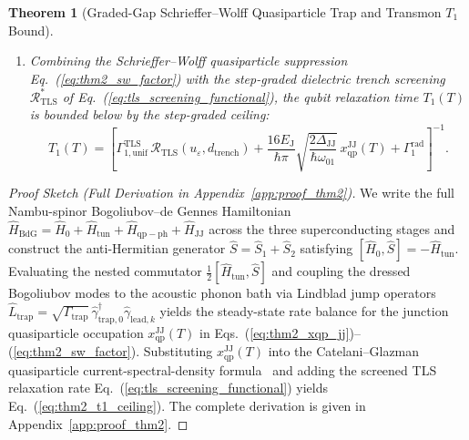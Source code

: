 \documentclass[11pt,letterpaper]{article}
\newtheorem{theorem}{Theorem}
\theoremstyle{definition}
\begin{document}
\begin{theorem}[Graded-Gap Schrieffer--Wolff Quasiparticle Trap and Transmon $T_1$ Bound]
\begin{enumerate}
  \item[(ii)] Combining the Schrieffer--Wolff quasiparticle suppression Eq.~(\ref{eq:thm2_sw_factor}) with the step-graded dielectric trench screening $\mathcal{R}_{\mathrm{TLS}}^*$ of Eq.~(\ref{eq:tls_screening_functional}), the qubit relaxation time $T_1(T)$ is bounded below by the step-graded ceiling:
  \begin{equation}
    T_1(T) = \left[ \Gamma_{1,\mathrm{unif}}^{\mathrm{TLS}} \, \mathcal{R}_{\mathrm{TLS}}(u_\varepsilon, d_{\mathrm{trench}}) + \frac{16 E_{\mathrm{J}}}{\hbar \pi} \sqrt{\frac{2\Delta_{\mathrm{JJ}}}{\hbar\omega_{01}}} \, x_{\mathrm{qp}}^{\mathrm{JJ}}(T) + \Gamma_1^{\mathrm{rad}} \right]^{-1}.
    \label{eq:thm2_t1_ceiling}
  \end{equation}
\end{enumerate}
\end{theorem}

\begin{proof}[Proof Sketch (Full Derivation in Appendix~\ref{app:proof_thm2})]
We write the full Nambu-spinor Bogoliubov--de Gennes Hamiltonian $\hat{H}_{\mathrm{BdG}} = \hat{H}_0 + \hat{H}_{\mathrm{tun}} + \hat{H}_{\mathrm{qp-ph}} + \hat{H}_{\mathrm{JJ}}$ across the three superconducting stages and construct the anti-Hermitian generator $\hat{S} = \hat{S}_1 + \hat{S}_2$ satisfying $[\hat{H}_0, \hat{S}] = -\hat{H}_{\mathrm{tun}}$. Evaluating the nested commutator $\frac{1}{2}[\hat{H}_{\mathrm{tun}}, \hat{S}]$ and coupling the dressed Bogoliubov modes to the acoustic phonon bath via Lindblad jump operators $\hat{L}_{\mathrm{trap}} = \sqrt{\Gamma_{\mathrm{trap}}}\,\hat{\gamma}_{\mathrm{trap},0}^\dagger \hat{\gamma}_{\mathrm{lead},k}$ yields the steady-state rate balance for the junction quasiparticle occupation $x_{\mathrm{qp}}^{\mathrm{JJ}}(T)$ in Eqs.~(\ref{eq:thm2_xqp_jj})--(\ref{eq:thm2_sw_factor}). Substituting $x_{\mathrm{qp}}^{\mathrm{JJ}}(T)$ into the Catelani--Glazman quasiparticle current-spectral-density formula~\cite{Catelani2011} and adding the screened TLS relaxation rate Eq.~(\ref{eq:tls_screening_functional}) yields Eq.~(\ref{eq:thm2_t1_ceiling}). The complete derivation is given in Appendix~\ref{app:proof_thm2}.
\end{proof}
\end{document}
